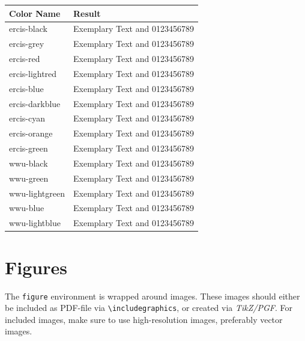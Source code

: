 \begin{table}[caption={Colors defined by the template}, label=tab:colors]
	\centering
		\begin{tabular}{@{}ll@{}}
			\toprule
			{\bf Color Name} & {\bf Result} \\ \midrule
			ercis-black      & \textcolor{ercis-black}{Exemplary Text and 0123456789}  \\
			ercis-grey      & \textcolor{ercis-grey}{Exemplary Text and 0123456789}  \\
			ercis-red      & \textcolor{ercis-red}{Exemplary Text and 0123456789}  \\
			ercis-lightred      & \textcolor{ercis-lightred}{Exemplary Text and 0123456789}  \\
			ercis-blue      & \textcolor{ercis-blue}{Exemplary Text and 0123456789}  \\
			ercis-darkblue      & \textcolor{ercis-darkblue}{Exemplary Text and 0123456789}  \\
			ercis-cyan    & \textcolor{ercis-cyan}{Exemplary Text and 0123456789}  \\
			ercis-orange      & \textcolor{ercis-orange}{Exemplary Text and 0123456789}  \\
			ercis-green      & \textcolor{ercis-green}{Exemplary Text and 0123456789}  \\ \midrule
			wwu-black      & \textcolor{wwu-black}{Exemplary Text and 0123456789}  \\
			wwu-green      & \textcolor{wwu-green}{Exemplary Text and 0123456789}  \\
			wwu-lightgreen      & \textcolor{wwu-lightgreen}{Exemplary Text and 0123456789}  \\
			wwu-blue     & \textcolor{wwu-blue}{Exemplary Text and 0123456789}  \\
			wwu-lightblue      & \textcolor{wwu-lightblue}{Exemplary Text and 0123456789}  \\ \bottomrule
		\end{tabular}
\end{table}


\section{Figures}

The \texttt{figure} environment is wrapped around images. These images should either be included as PDF-file via \texttt{\textbackslash includegraphics}, or created via \textit{TikZ/PGF}. For included images, make sure to use high-resolution images, preferably vector images.

